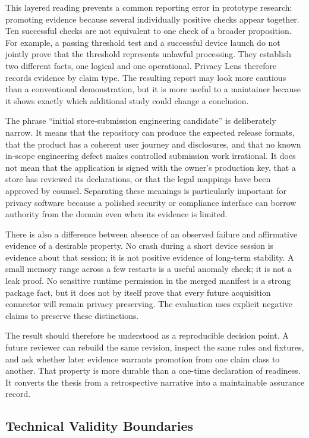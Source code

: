 This layered reading prevents a common reporting error in prototype research: promoting evidence because several individually positive checks appear together. Ten successful checks are not equivalent to one check of a broader proposition. For example, a passing threshold test and a successful device launch do not jointly prove that the threshold represents unlawful processing. They establish two different facts, one logical and one operational. Privacy Lens therefore records evidence by claim type. The resulting report may look more cautious than a conventional demonstration, but it is more useful to a maintainer because it shows exactly which additional study could change a conclusion.

The phrase ``initial store-submission engineering candidate'' is deliberately narrow. It means that the repository can produce the expected release formats, that the product has a coherent user journey and disclosures, and that no known in-scope engineering defect makes controlled submission work irrational. It does not mean that the application is signed with the owner's production key, that a store has reviewed its declarations, or that the legal mappings have been approved by counsel. Separating these meanings is particularly important for privacy software because a polished security or compliance interface can borrow authority from the domain even when its evidence is limited.

There is also a difference between absence of an observed failure and affirmative evidence of a desirable property. No crash during a short device session is evidence about that session; it is not positive evidence of long-term stability. A small memory range across a few restarts is a useful anomaly check; it is not a leak proof. No sensitive runtime permission in the merged manifest is a strong package fact, but it does not by itself prove that every future acquisition connector will remain privacy preserving. The evaluation uses explicit negative claims to preserve these distinctions.

The result should therefore be understood as a reproducible decision point. A future reviewer can rebuild the same revision, inspect the same rules and fixtures, and ask whether later evidence warrants promotion from one claim class to another. That property is more durable than a one-time declaration of readiness. It converts the thesis from a retrospective narrative into a maintainable assurance record.

\subsection{Technical Validity Boundaries}

